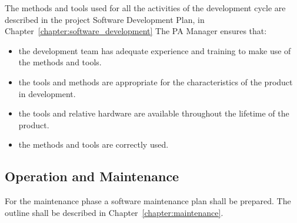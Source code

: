 The methods and tools used for all the activities of the development cycle are described in the project Software Development Plan, in Chapter~\ref{chapter:software_development}
The PA Manager ensures that:
\begin{itemize}
  \item the development team has adequate experience and training to make use of  the methods and tools.
  \item the tools and methods are appropriate for the characteristics of the product in development.
  \item the tools and relative hardware are available throughout the lifetime of the product.
  \item the methods and tools are correctly used.
\end{itemize}


\subsection{Operation and Maintenance}
For the maintenance phase a software maintenance plan shall be prepared.
The outline shall be described in Chapter~\ref{chapter:maintenance}.
